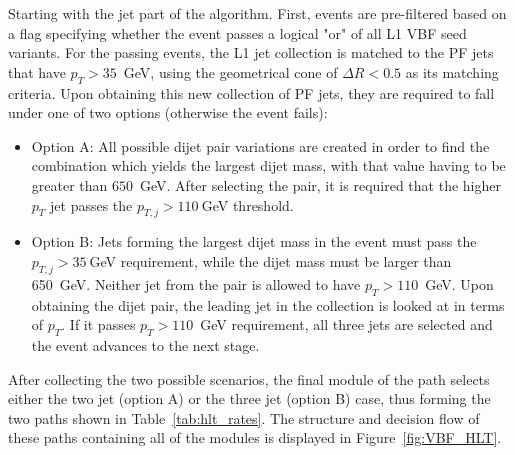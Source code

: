 Starting with the jet part of the algorithm. First, events are pre-filtered based on a flag specifying whether the event passes a logical "or" of all L1 VBF seed variants. For the passing events, the L1 jet collection is matched to the PF jets that have $p_T>35$~GeV, using the geometrical cone of $\Delta R<0.5$ as its matching criteria. Upon obtaining this new collection of PF jets, they are required to fall under one of two options (otherwise the event fails):
\begin{itemize}
    \item Option A: All possible dijet pair variations are created in order to find the combination which yields the largest dijet mass, with that value having to be greater than $650$~GeV. After selecting the pair, it is required that the higher $p_T$ jet passes  the $p_{T,j}>110~$GeV threshold.
    
    \item Option B: Jets forming the largest dijet mass in the event must pass the $p_{T,j}>35~$GeV requirement, while the dijet mass must be larger than 650~GeV. Neither jet from the pair is allowed to have $p_T>110$~GeV. Upon obtaining the dijet pair, the leading jet in the collection is looked at in terms of $p_T$. If it passes $p_T>110$~GeV requirement, all three jets are selected and the event advances to the next stage.
\end{itemize}
After collecting the two possible scenarios, the final module of the path selects either the two jet (option A) or the three jet (option B) case, thus forming the two paths shown in Table~\ref{tab:hlt_rates}. The structure and decision flow of these paths containing all of the modules is displayed in Figure~\ref{fig:VBF_HLT}.
